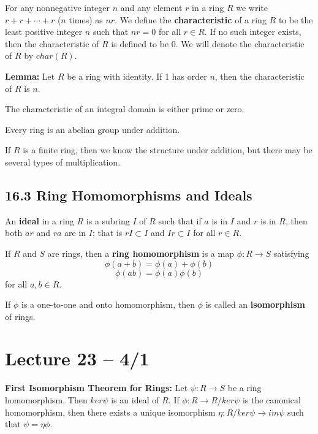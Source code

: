 \documentclass{article}
\begin{document}
For any nonnegative integer $n$ and any element $r$ in a ring $R$ we write $r+r+\cdots+r$ ($n$ times) as $nr$. We define the \textbf{characteristic} of a ring $R$ to be the least positive integer $n$ such that $nr=0$ for all $r\in R$. If no such integer exists, then the characteristic of $R$ is defined to be $0$. We will denote the characteristic of $R$ by $char(R)$.

\textbf{Lemma:} Let $R$ be a ring with identity. If 1 has order $n$, then the characteristic of $R$ is $n$.
\begin{theorem}
  The characteristic of an integral domain is either prime or zero.
\end{theorem}

Every ring is an abelian group under addition.

If $R$ is a finite ring, then we know the structure under addition, but there may be several types of multiplication.

\subsection{16.3 Ring Homomorphisms and Ideals}
An \textbf{ideal} in a ring $R$ is a subring $I$ of $R$ such that if $a$ is in $I$ and $r$ is in $R$, then both $ar$ and $ra$ are in $I$; that is $rI\subset I$ and $Ir\subset I$ for all $r\in R$.

If $R$ and $S$ are rings, then a \textbf{ring homomorphism} is a map $\phi:R\to S$ satisfying \[\phi(a+b)=\phi(a)+\phi(b)\]\[\phi(ab)=\phi(a)\phi(b)\] for all $a,b\in R$.

If $\phi$ is a one-to-one and onto homomorphism, then $\phi$ is called an \textbf{isomorphism} of rings.

\section{Lecture 23 -- 4/1}
\begin{theorem}
  \textbf{First Isomorphism Theorem for Rings:} Let $\psi:R\to S$ be a ring homomorphism. Then $ker\psi$ is an ideal of $R$. If $\phi:R\to R/ker\psi$ is the canonical homomorphism, then there exists a unique isomorphism $\eta:R/ker\psi\to im\psi$ such that $\psi=\eta\phi$.
\end{theorem}
\end{document}
